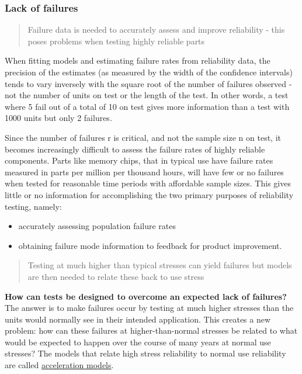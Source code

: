 \documentclass[]{book}
\providecommand{\tightlist}{%
  \setlength{\itemsep}{0pt}\setlength{\parskip}{0pt}}
\theoremstyle{definition}
\theoremstyle{definition}
\theoremstyle{definition}
\theoremstyle{remark}
\begin{document}
\subsubsection{Lack of failures}\label{lack-of-failures}

\begin{quote}
Failure data is needed to accurately assess and improve reliability -
this poses problems when testing highly reliable parts
\end{quote}

When fitting models and estimating failure rates from reliability data,
the precision of the estimates (as measured by the width of the
confidence intervals) tends to vary inversely with the square root of
the number of failures observed - not the number of units on test or the
length of the test. In other words, a test where 5 fail out of a total
of 10 on test gives more information than a test with 1000 units but
only 2 failures.

Since the number of failures r is critical, and not the sample size n on
test, it becomes increasingly difficult to assess the failure rates of
highly reliable components. Parts like memory chips, that in typical use
have failure rates measured in parts per million per thousand hours,
will have few or no failures when tested for reasonable time periods
with affordable sample sizes. This gives little or no information for
accomplishing the two primary purposes of reliability testing, namely:

\begin{itemize}
\tightlist
\item
  accurately assessing population failure rates
\item
  obtaining failure mode information to feedback for product
  improvement.
\end{itemize}

\begin{quote}
Testing at much higher than typical stresses can yield failures but
models are then needed to relate these back to use stress
\end{quote}

\textbf{How can tests be designed to overcome an expected lack of
failures?} The answer is to make failures occur by testing at much
higher stresses than the units would normally see in their intended
application. This creates a new problem: how can these failures at
higher-than-normal stresses be related to what would be expected to
happen over the course of many years at normal use stresses? The models
that relate high stress reliability to normal use reliability are called
\href{link}{acceleration models}.
\end{document}
